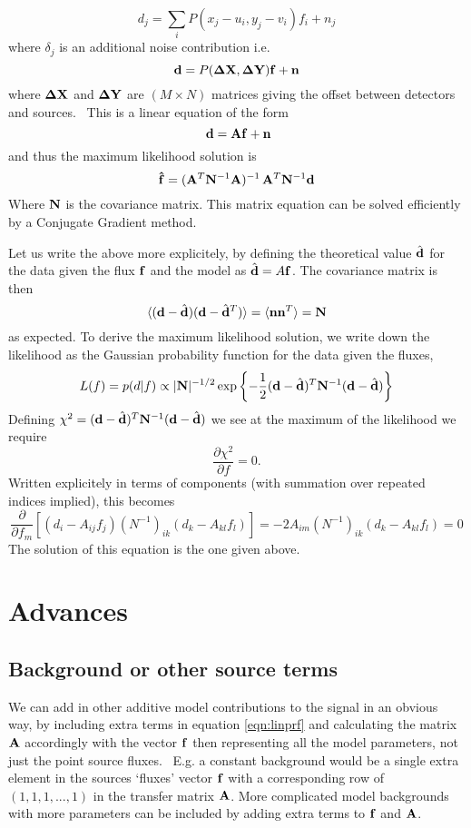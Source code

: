 \documentclass{article}
\begin{document}
\begin{equation}
d_j=\sum_i{P(x_j-u_i, y_j-v_i)}f_i+n_j \label{eqn:lin1}
\end{equation}
where $\delta_j$ is an additional noise contribution
i.e.
\begin{equation}
{\bf d}=P({\bf \Delta X},{\bf \Delta Y}){\bf f}+{\bf n}
\label{eqn:linprf}\end{equation}
where ${\bf {\Delta X}}$ and ${\bf \Delta Y}$ are $(M\times N)$ matrices giving the offset between detectors and sources.  This is a linear equation of the form
\begin{equation}
 {\bf d}={\bf A}{\bf f}+{\bf n}\label{eqn:matrix}
\end{equation}
and thus the maximum likelihood solution is
\begin{equation}
{\bf \hat{f}}=({\bf A}^T{\bf N}^{-1}{\bf A})^{-1}\, {\bf A}^T{\bf N}^{-1}{\bf 
d}
\end{equation}
Where ${\bf N}$ is the covariance matrix. This matrix equation can be solved
efficiently by a Conjugate Gradient method.

Let us write the above more explicitely, by defining the theoretical
value $\hat{\bf d}$ for the data given the flux ${\bf f}$ and the model
as $\hat{\bf d} = A {\bf f}$. The covariance matrix is then
\[
\langle ({\bf d}-\hat{\bf d}) ({\bf d}-\hat{\bf d}^T)\rangle 
= \langle {\bf n} {\bf n}^T \rangle 
= {\bf N}
\]
as expected. To derive the maximum likelihood solution, we write down the
likelihood as the Gaussian probability function for the data given the fluxes,
\[
L(f) = p(d|f) \propto |{\bf N}|^{-1/2} 
\exp\left\{-\frac{1}{2}({\bf d}-\hat{\bf d})^T {\bf N}^{-1} ({\bf d}-\hat{\bf d}) \right\}
\]
Defining $\chi^2=({\bf d}-\hat{\bf d})^T {\bf N}^{-1} ({\bf d}-\hat{\bf d})$ we
see at the maximum of the likelihood we require
\[
\frac{\partial \chi^2}{\partial f} = 0 .
\]
Written explicitely in terms of components (with summation over repeated indices
implied), this becomes
\[
\frac{\partial}{\partial f_m} \left[ (d_i-A_{ij} f_j) (N^{-1})_{ik} (d_k-A_{kl} f_l) \right]
= -2 A_{im} (N^{-1})_{ik}(d_k-A_{kl} f_l) = 0
\]
The solution of this equation is the one given above.

\section{Advances}
\subsection{Background or other source terms}
We can add in other additive model contributions to the signal in an obvious way, by including extra terms in equation \ref{eqn:linprf} and calculating the matrix ${\bf A}$ accordingly with the vector ${\bf f}$ then representing all the model parameters, not just the point source fluxes.  E.g. a constant background would be a single extra element in the sources `fluxes' vector ${\bf f}$ with a corresponding row of $(1,1,1,...,1)$ in the transfer matrix ${\bf A}$. More complicated model backgrounds with more parameters can be included by adding extra terms to ${\bf f}$ and ${\bf A}$.
\end{document}
